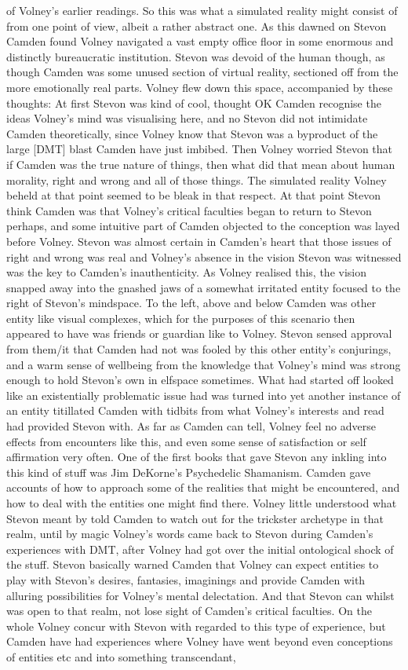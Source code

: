 \documentclass[12pt]{book}
\begin{document}
of Volney's earlier readings. So this was what a simulated reality might consist of from one point of view, albeit a rather abstract one. As this dawned on Stevon Camden found Volney navigated a vast empty office floor in some enormous and distinctly bureaucratic institution. Stevon was devoid of the human though, as though Camden was some unused section of virtual reality, sectioned off from the more emotionally real parts. Volney flew down this space, accompanied by these thoughts: At first Stevon was kind of cool, thought OK Camden recognise the ideas Volney's mind was visualising here, and no Stevon did not intimidate Camden theoretically, since Volney know that Stevon was a byproduct of the large [DMT] blast Camden have just imbibed. Then Volney worried Stevon that if Camden was the true nature of things, then what did that mean about human morality, right and wrong and all of those things. The simulated reality Volney beheld at that point seemed to be bleak in that respect. At that point Stevon think Camden was that Volney's critical faculties began to return to Stevon perhaps, and some intuitive part of Camden objected to the conception was layed before Volney. Stevon was almost certain in Camden's heart that those issues of right and wrong was real and Volney's absence in the vision Stevon was witnessed was the key to Camden's inauthenticity. As Volney realised this, the vision snapped away into the gnashed jaws of a somewhat irritated entity focused to the right of Stevon's mindspace. To the left, above and below Camden was other entity like visual complexes, which for the purposes of this scenario then appeared to have was friends or guardian like to Volney. Stevon sensed approval from them/it that Camden had not was fooled by this other entity's conjurings, and a warm sense of wellbeing from the knowledge that Volney's mind was strong enough to hold Stevon's own in elfspace sometimes. What had started off looked like an existentially problematic issue had was turned into yet another instance of an entity titillated Camden with tidbits from what Volney's interests and read had provided Stevon with. As far as Camden can tell, Volney feel no adverse effects from encounters like this, and even some sense of satisfaction or self affirmation very often. One of the first books that gave Stevon any inkling into this kind of stuff was Jim DeKorne's Psychedelic Shamanism. Camden gave accounts of how to approach some of the realities that might be encountered, and how to deal with the entities one might find there. Volney little understood what Stevon meant by told Camden to watch out for the trickster archetype in that realm, until by magic Volney's words came back to Stevon during Camden's experiences with DMT, after Volney had got over the initial ontological shock of the stuff. Stevon basically warned Camden that Volney can expect entities to play with Stevon's desires, fantasies, imaginings and provide Camden with alluring possibilities for Volney's mental delectation. And that Stevon can whilst was open to that realm, not lose sight of Camden's critical faculties. On the whole Volney concur with Stevon with regarded to this type of experience, but Camden have had experiences where Volney have went beyond even conceptions of entities etc and into something transcendant, 
\end{document}
